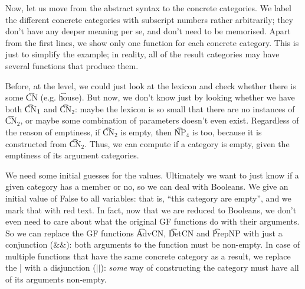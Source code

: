 Now, let us move from the \gf{} abstract syntax to the \pmcfg{} concrete
categories. We label the different concrete categories with
subscript numbers rather arbitrarily; they don't have any deeper
meaning per se, and don't need to be memorised. Apart from the first
lines, we show only one function for each concrete category. This is
just to simplify the example; in reality, all of the result categories
may have several functions that produce them.

\begin{EmptyItem}
\begin{Highlighting}[]
  \OtherTok{::=}    \FunctionTok{|}    \NormalTok{;}
  \OtherTok{::=}   \FunctionTok{|}  \NormalTok{;}
  \OtherTok{::=}    \NormalTok{;}
  \OtherTok{::=}    \NormalTok{;}
  \OtherTok{::=}    \NormalTok{;}
  \OtherTok{::=}  \NormalTok{;}
  \OtherTok{::=}  \NormalTok{;}
  \OtherTok{::=}  \NormalTok{;}
\end{Highlighting}
\end{EmptyItem}


Before, at the \gf{} level, we could just look at the lexicon and check whether there is some \t{CN} (e.g. \t{house}). But now, we don't know just by looking whether we have both \t{CN$_{\text 1}$} and \t{CN$_\text{2}$}: maybe the lexicon is so small that there are no instances of \t{CN$_\text{2}$}, or maybe some combination of parameters doesn't even exist. Regardless of the reason of emptiness, if \t{CN$_\text{2}$} is empty, then \t{NP$_\text{4}$} is too, because it is constructed from \t{CN$_\text{2}$}.  Thus, we can compute if a category is empty, given the emptiness of its argument categories.

We need some initial guesses for the values. Ultimately we want to
just know if a given category has a member or no, so we can deal with
Booleans. We give an initial value of False to all variables: that is,
``this category are empty'', and we mark that with red text.
In fact, now that we are reduced to Booleans, we don’t even need to care about what the original GF functions do with their arguments. So we can replace the GF functions \t{AdvCN}, \t{DetCN} and \t{PrepNP} with just a  conjunction ($\&\&$): both arguments to the function must be non-empty. In case of multiple functions that have the same concrete category as a result, we replace the | with a disjunction ($||$): \emph{some} way of constructing the category must have all of its arguments non-empty.

